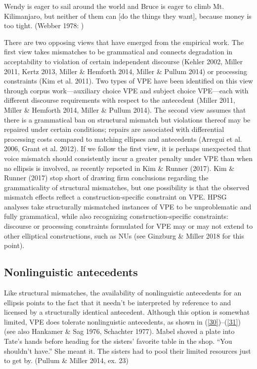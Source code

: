 \documentclass[output=paper
                ,modfonts
                ,nonflat
	        ,collection
	        ,collectionchapter
	        ,collectiontoclongg
 	        ,biblatex
                ,babelshorthands
                ,newtxmath
                ,draftmode
                ,colorlinks, citecolor=brown
]{./langsci/langscibook}
\begin{document}
{\ea Wendy is eager to sail around the world and Bruce is eager to climb Mt. Kilimanjaro, but neither of them can [do the things they want], because money is too tight. (Webber 1978: )\label{29}\z

There are two opposing views that have emerged from the empirical work. The first view takes mismatches to be grammatical and connects degradation in acceptability to violation of certain independent discourse (Kehler 2002, Miller 2011, Kertz 2013, Miller \& Hemforth 2014, Miller \& Pullum 2014) or processing constraints (Kim et al. 2011). Two types of VPE have been identified on this view through corpus work---auxiliary choice VPE and subject choice VPE---each with different discourse requirements with respect to the antecedent (Miller 2011, Miller \& Hemforth 2014, Miller \& Pullum 2014). The second view assumes that there is a grammatical ban on structural mismatch but violations thereof may be repaired under certain conditions; repairs are associated with differential processing costs compared to matching ellipses and antecedents (Arregui et al. 2006, Grant et al. 2012). If we follow the first view, it is perhaps unexpected that voice mismatch should consistently incur a greater penalty under VPE than when no ellipsis is involved, as recently reported in Kim \& Runner (2017). Kim \& Runner (2017) stop short of drawing firm conclusions regarding the grammaticality of structural mismatches, but one possibility is that the observed mismatch effects reflect a construction-specific constraint on VPE. HPSG analyses take structurally mismatched instances of VPE to be unproblematic and fully grammatical, while also recognizing construction-specific constraints: discourse or processing constraints formulated for VPE may or may not extend to other elliptical constructions, such as NUs (see Ginzburg \& Miller 2018 for this point).


\subsection{Nonlinguistic antecedents}
Like structural mismatches, the availability of nonlinguistic antecedents for an ellipsis points to the fact that it needn't be interpreted by reference to and licensed by a structurally identical antecedent. Although this option is somewhat limited, VPE does tolerate nonlinguistic antecedents, as shown in (\ref{30})--(\ref{31}) (see also Hankamer \& Sag 1976, Schachter 1977).
\ea Mabel shoved a plate into Tate's hands before heading for the sisters' favorite table in the shop. ``You shouldn't have.'' She meant it. The sisters had to pool their limited resources
just to get by. (Pullum \& Miller 2014, ex. 23)\label{30}\z

}
\end{document}
